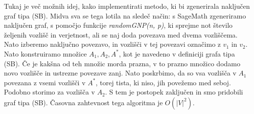 \documentclass{article}
\begin{document}
Tukaj je več možnih idej, kako implementirati metodo, ki bi zgenerirala naključen graf tipa (SB). Midva sva se tega lotila na sledeč način: s SageMath zgeneriramo naključen graf, s pomočjo funkcije \textit{randomGNP(n, p)}, ki sprejme not število željenih vozlišč in verjetnost, ali se naj doda povezava med dvema vozliščema. Nato izberemo naključno povezavo, in vozlišči v tej povezavi označimo z $v_1$ in $v_2$. Nato konstruiramo množice $A_1, A_2, A^*$, kot je navedeno v definiciji grafa tipa (SB). Če je kakšna od teh množic morda prazna, v to prazno množico dodamo novo vozlišče in ustrezne povezave zanj. Nato poskrbimo, da so vsa vozlišča v $A_1$ povezana z vsemi vozlišči v $A^*$, torej tista, ki niso, jih povežemo med seboj. Podobno storimo za vozlišča v $A_2$. S tem je postopek zaključen in smo pridobili graf tipa (SB). Časovna zahtevnost tega algoritma je $O(|V|^2)$.
\end{document}
